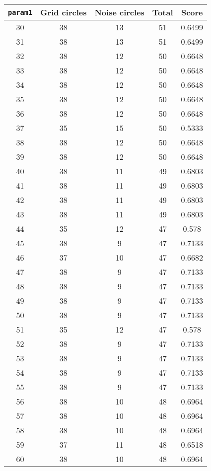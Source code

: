 \documentclass[letterpaper, 12pt]{article}
\begin{document}
\begin{longtable}{|c|c|c|c|c|}
\hline
\textbf{\texttt{param1}} & \textbf{Grid circles} & \textbf{Noise circles} & \textbf{Total} & \textbf{Score} \\
\hline
30 & 38 & 13 & 51 & 0.6499 \\
\hline
31 & 38 & 13 & 51 & 0.6499 \\
\hline
32 & 38 & 12 & 50 & 0.6648 \\
\hline
33 & 38 & 12 & 50 & 0.6648 \\
\hline
34 & 38 & 12 & 50 & 0.6648 \\
\hline
35 & 38 & 12 & 50 & 0.6648 \\
\hline
36 & 38 & 12 & 50 & 0.6648 \\
\hline
37 & 35 & 15 & 50 & 0.5333 \\
\hline
38 & 38 & 12 & 50 & 0.6648 \\
\hline
39 & 38 & 12 & 50 & 0.6648 \\
\hline
40 & 38 & 11 & 49 & 0.6803 \\
\hline
41 & 38 & 11 & 49 & 0.6803 \\
\hline
42 & 38 & 11 & 49 & 0.6803 \\
\hline
43 & 38 & 11 & 49 & 0.6803 \\
\hline
44 & 35 & 12 & 47 & 0.578 \\
\hline
45 & 38 & 9 & 47 & 0.7133 \\
\hline
46 & 37 & 10 & 47 & 0.6682 \\
\hline
47 & 38 & 9 & 47 & 0.7133 \\
\hline
48 & 38 & 9 & 47 & 0.7133 \\
\hline
49 & 38 & 9 & 47 & 0.7133 \\
\hline
50 & 38 & 9 & 47 & 0.7133 \\
\hline
51 & 35 & 12 & 47 & 0.578 \\
\hline
52 & 38 & 9 & 47 & 0.7133 \\
\hline
53 & 38 & 9 & 47 & 0.7133 \\
\hline
54 & 38 & 9 & 47 & 0.7133 \\
\hline
55 & 38 & 9 & 47 & 0.7133 \\
\hline
56 & 38 & 10 & 48 & 0.6964 \\
\hline
57 & 38 & 10 & 48 & 0.6964 \\
\hline
58 & 38 & 10 & 48 & 0.6964 \\
\hline
59 & 37 & 11 & 48 & 0.6518 \\
\hline
60 & 38 & 10 & 48 & 0.6964 \\

\end{longtable}
\end{document}
